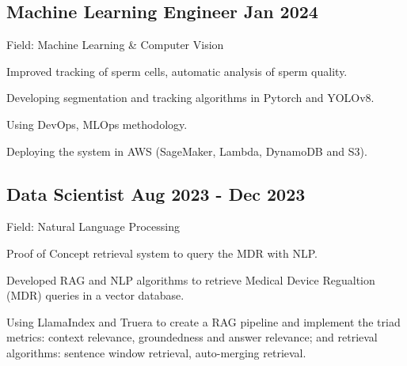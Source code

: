 \documentclass[a4paper,12pt]{article}
\begin{document}


\subsection{Machine Learning Engineer \hfill Jan 2024}
\vspace*{1pt}
Field: Machine Learning \& Computer Vision \\
\vspace*{\spaceAfterField}
\begin{zitemize}

    \item Improved tracking of sperm cells, automatic analysis of sperm quality.
    \item Developing segmentation and tracking algorithms in Pytorch and YOLOv8. 
    \item Using DevOps, MLOps methodology.
    \item Deploying the system in AWS (SageMaker, Lambda, DynamoDB and S3).

\end{zitemize}
\vspace*{5pt}


\subsection{Data Scientist \hfill Aug 2023 - Dec 2023}
\vspace*{1pt}
Field: Natural Language Processing \\
\vspace*{\spaceAfterField}
\begin{zitemize}
    \item Proof of Concept retrieval system to query the MDR with NLP.
    \item Developed RAG and NLP algorithms to retrieve Medical Device Regualtion (MDR) queries in a vector database.
    \item Using LlamaIndex and Truera to create a RAG pipeline and implement the triad metrics: context relevance, groundedness and answer relevance; and retrieval algorithms: sentence window retrieval, auto-merging retrieval.

\end{zitemize}
\vspace*{5pt}
\end{document}

